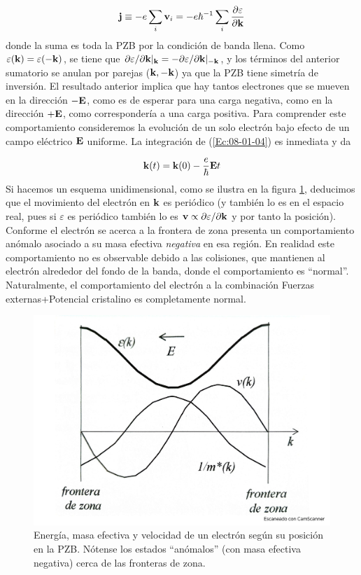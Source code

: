 \begin{equation*}
	\mathbf{j} \equiv - e \sum_i \mathbf{v}_i= -e \hbar^{-1} \sum_i \frac{\partial \varepsilon}{\partial \mathbf{k}}
\end{equation*}
donde la suma es toda la PZB por la condición de banda llena. Como $\varepsilon(\mathbf{k})=\varepsilon(-\mathbf{k})$, se tiene que $\partial \varepsilon / \partial \mathbf{k} |_{\mathbf{k}} = - \partial \varepsilon / \partial \mathbf{k} |_{-\mathbf{k}}$, y los términos del anterior sumatorio se anulan por parejas ($\mathbf{k},-\mathbf{k}$) ya que la PZB tiene simetría de inversión. El resultado anterior implica que hay tantos electrones que se mueven en la dirección $-\mathbf{E}$, como es de esperar para una carga negativa, como en la dirección $+\mathbf{E}$, como correspondería a una carga positiva. Para comprender este comportamiento consideremos la evolución de un solo electrón bajo efecto de un campo eléctrico $\mathbf{E}$ uniforme. La integración de (\ref{Ec:08-01-04}) es inmediata y da 

\begin{equation}
	\mathbf{k} (t) = \mathbf{k}(0) - \frac{e}{\hbar} \mathbf{E} t
\end{equation}
Si hacemos un esquema unidimensional, como se ilustra en la figura \ref{Fig:08-02}, deducimos que el movimiento del electrón en $\mathbf{k}$ es periódico (y también lo es en el espacio real, pues si $\varepsilon$ es periódico también lo es $\mathbf{v} \propto \partial \varepsilon / \partial \mathbf{k}$ y por tanto la posición). Conforme el electrón se acerca a la frontera de zona presenta un comportamiento anómalo asociado a su masa efectiva \textit{negativa} en esa región. En realidad este comportamiento no es observable debido a las colisiones,  que mantienen al electrón alrededor del fondo de la banda, donde el comportamiento es ``normal''. Naturalmente, el comportamiento del electrón a la combinación Fuerzas externas+Potencial cristalino es completamente normal.

\begin{figure}[h!] \centering
	\includegraphics[scale=0.35]{Cuerpo/Ch_08/Fotos libro 2.pdf}
	\caption{Energía, masa efectiva y velocidad de un electrón según su posición en la PZB. Nótense los estados ``anómalos'' (con masa efectiva negativa) cerca de las fronteras de zona.}
	\label{Fig:08-02}
\end{figure}

